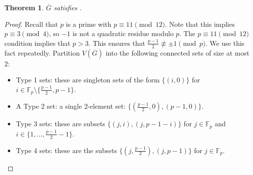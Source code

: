 \documentclass[11pt]{article}
\numberwithin{equation}{section}
\theoremstyle{plain}
\newtheorem{thm}[equation]{Theorem}
\theoremstyle{definition}
\newcommand{\F}{\mathbb{F}}
\begin{document}
\begin{thm}
    \label{thm:eberhard}
    $\overline{G}$ satisfies .
\end{thm}
\begin{proof}
    Recall that $p$ is a prime with $p \equiv 11 \pmod{12}$. Note that this implies $p \equiv 3 \pmod{4}$, so $-1$ is not a quadratic residue modulo $p$. The $p \equiv 11 \pmod{12}$ condition implies that $p > 3$. This ensures that $\frac{p-1}{2} \not\equiv \pm 1 \pmod{p}$. We use this fact repeatedly. Partition $V(\overline{G})$ into the following connected sets of size at most $2$:
    \begin{itemize}
        \item Type 1 sets: these are singleton sets of the form $\{ (i, 0) \}$ for $i \in \F_p \setminus \{\frac{p-1}{2}, p-1\}$.
        \item A Type 2 set: a single $2$-element set: $\{ (\frac{p-1}{2} , 0), (p-1, 0) \}$.
        \item Type 3 sets: these are subsets $\{ (j, i), (j, p-1-i) \}$ for $j \in \F_p$ and $i \in \{ 1, \dots, \frac{p-1}{2} - 1 \}$.
        \item Type 4 sets: these are the subsets $\{ (j, \frac{p-1}{2} ), (j, p-1) \}$ for $j \in \F_p$.
    \end{itemize}


\end{proof}
\end{document}
